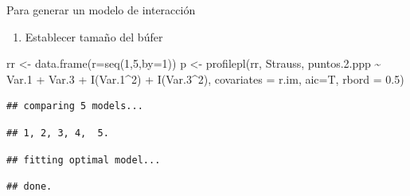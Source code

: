 \documentclass[
  11pt,
  ignorenonframetext,
]{beamer}
\newenvironment{Shaded}{}{}
\newcommand{\AttributeTok}[1]{\textcolor[rgb]{0.49,0.56,0.16}{#1}}
\newcommand{\DecValTok}[1]{\textcolor[rgb]{0.25,0.63,0.44}{#1}}
\newcommand{\FloatTok}[1]{\textcolor[rgb]{0.25,0.63,0.44}{#1}}
\newcommand{\FunctionTok}[1]{\textcolor[rgb]{0.02,0.16,0.49}{#1}}
\newcommand{\NormalTok}[1]{#1}
\newcommand{\OtherTok}[1]{\textcolor[rgb]{0.00,0.44,0.13}{#1}}
\newcommand{\SpecialCharTok}[1]{\textcolor[rgb]{0.25,0.44,0.63}{#1}}
\providecommand{\tightlist}{%
  \setlength{\itemsep}{0pt}\setlength{\parskip}{0pt}}
\begin{document}
\begin{frame}[fragile]{Para generar un modelo de interacción}
\protect\hypertarget{para-generar-un-modelo-de-interacciuxf3n}{}
\begin{enumerate}
\tightlist
\item
  Establecer tamaño del búfer
\end{enumerate}

\begin{Shaded}
\begin{Highlighting}[]
\NormalTok{rr }\OtherTok{\textless{}{-}} \FunctionTok{data.frame}\NormalTok{(}\AttributeTok{r=}\FunctionTok{seq}\NormalTok{(}\DecValTok{1}\NormalTok{,}\DecValTok{5}\NormalTok{,}\AttributeTok{by=}\DecValTok{1}\NormalTok{))}
\NormalTok{p }\OtherTok{\textless{}{-}} \FunctionTok{profilepl}\NormalTok{(rr, Strauss, }
\NormalTok{               puntos.}\FloatTok{2.}\NormalTok{ppp }\SpecialCharTok{\textasciitilde{}}\NormalTok{ Var}\FloatTok{.1} \SpecialCharTok{+}\NormalTok{ Var}\FloatTok{.3} \SpecialCharTok{+} \FunctionTok{I}\NormalTok{(Var}\FloatTok{.1}\SpecialCharTok{\^{}}\DecValTok{2}\NormalTok{) }\SpecialCharTok{+} \FunctionTok{I}\NormalTok{(Var}\FloatTok{.3}\SpecialCharTok{\^{}}\DecValTok{2}\NormalTok{),}
          \AttributeTok{covariates =}\NormalTok{ r.im, }\AttributeTok{aic=}\NormalTok{T, }\AttributeTok{rbord =} \FloatTok{0.5}\NormalTok{)}
\end{Highlighting}
\end{Shaded}

\begin{verbatim}
## comparing 5 models...
\end{verbatim}

\begin{verbatim}
## 1, 2, 3, 4,  5.
\end{verbatim}

\begin{verbatim}
## fitting optimal model...
\end{verbatim}

\begin{verbatim}
## done.
\end{verbatim}
\end{frame}
\end{document}
